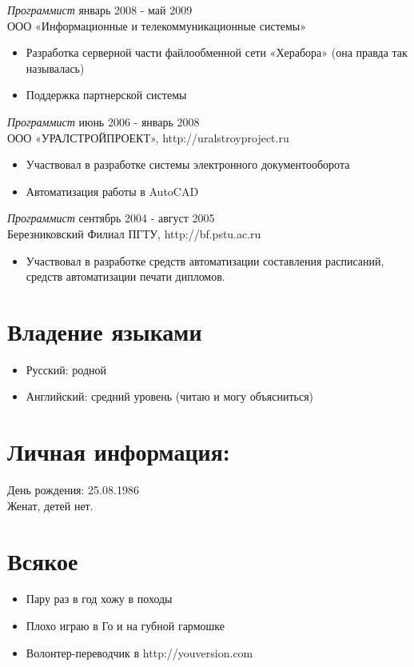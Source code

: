 \documentclass[margin]{res} %
\begin{document}
\begin{resume}
{\sl Программист} \hfill январь 2008 - май 2009 \\
ООО «Информационные и телекоммуникационные системы»
\begin{itemize}
\item Разработка серверной части файлообменной сети «Херабора» (она правда так называлась)
\item Поддержка партнерской системы
\end{itemize} 

{\sl Программист} \hfill июнь 2006 - январь 2008 \\
ООО «УРАЛСТРОЙПРОЕКТ», http://uralstroyproject.ru
\begin{itemize}
\item Участвовал в разработке системы электронного документооборота
\item Автоматизация работы в AutoCAD
\end{itemize} 

{\sl Программист} \hfill сентябрь 2004 - август 2005 \\
Березниковский Филиал ПГТУ, http://bf.pstu.ac.ru
\begin{itemize}
\item Участвовал в разработке средств автоматизации составления расписаний, средств автоматизации печати дипломов.
\end{itemize} 

\section{Владение языками}
\begin{itemize}
\item Русский: родной
\item Английский: средний уровень (читаю и могу объясниться)
\end{itemize}

\section{Личная информация:}
День рождения: 25.08.1986\\
Женат, детей нет. 

\section{Всякое} 
\begin{itemize}
\item Пару раз в год хожу в походы
\item Плохо играю в Го и на губной гармошке
\item Волонтер-переводчик в http://youversion.com
\end{itemize}

\end{resume}
\end{document}

